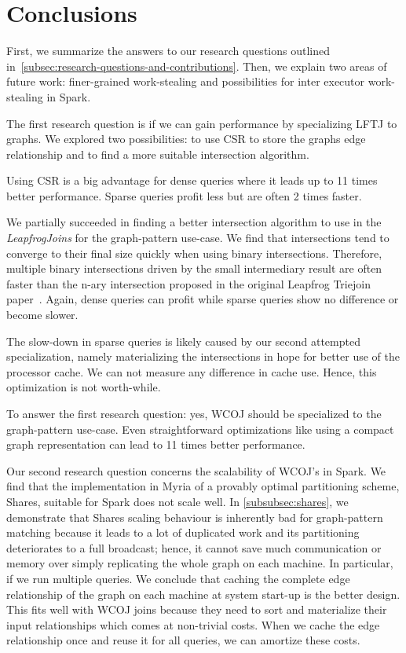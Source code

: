 \section{Conclusions} \label{sec:conclusions}

First, we summarize the answers to our research questions outlined in~\cref{subsec:research-questions-and-contributions}.
Then, we explain two areas of future work: finer-grained work-stealing and possibilities for inter executor work-stealing in Spark.

The first research question is if we can gain performance by specializing \textsc{LFTJ} to graphs.
We explored two possibilities: to use \textsc{CSR} to store the graphs edge relationship and to find a more suitable
intersection algorithm.

Using \textsc{CSR} is a big advantage for dense queries where it leads up to 11 times better performance.
Sparse queries profit less but are often 2 times faster.

We partially succeeded in finding a better intersection algorithm to use in the \textit{LeapfrogJoins} for the graph-pattern use-case.
We find that intersections tend to converge to their final size quickly when using binary intersections.
Therefore, multiple binary intersections driven by the small intermediary result are often faster than the n-ary intersection proposed in
the original Leapfrog Triejoin paper~\cite{lftj}.
Again, dense queries can profit while sparse queries show no difference or become slower.

The slow-down in sparse queries is likely caused by our second attempted specialization, namely materializing the intersections in
hope for better use of the processor cache.
We can not measure any difference in cache use.
Hence, this optimization is not worth-while.

To answer the first research question: yes, \textsc{WCOJ} should be specialized to the graph-pattern
use-case.
Even straightforward optimizations like using a compact graph representation can lead to 11 times
better performance.

Our second research question concerns the scalability of \textsc{WCOJ}'s in Spark.
We find that the implementation in Myria of a provably optimal partitioning scheme, Shares, suitable for
Spark does not scale well.
In \cref{subsubsec:shares}, we demonstrate that Shares scaling behaviour is inherently bad for graph-pattern matching because
it leads to a lot of duplicated work and its partitioning deteriorates to a full broadcast;
hence, it cannot save much communication or memory over simply replicating the whole graph on each machine.
In particular, if we run multiple queries.
We conclude that caching the complete edge relationship of the graph on each machine at system start-up is the better design.
This fits well with \textsc{WCOJ} joins because they need to sort and materialize their input relationships which comes at non-trivial
costs.
When we cache the edge relationship once and reuse it for all queries, we can amortize these costs.

